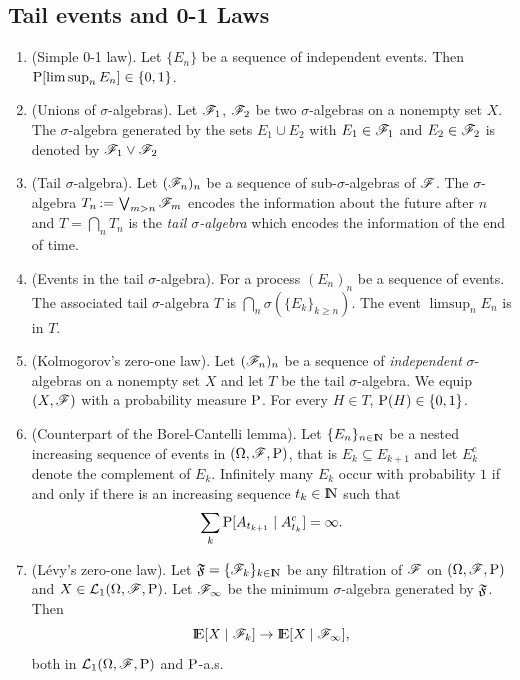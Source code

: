 \documentclass[a4paper,10pt]{scrbook}
\begin{document}
\subsection{Tail events and 0-1 Laws}
\begin{enumerate}

 \item (Simple 0-1 law). Let $\{E_n\}$ be a sequence of independent events. Then $\mathrm{P}[\limsup_n E_n]\in \{0,1\}$.
 \item (Unions of $\sigma$-algebras). Let $\mathscr{F}_1$, $\mathscr{F}_2$ be two $\sigma$-algebras on a nonempty set $X$.
       The $\sigma$-algebra generated by the sets $E_1\cup E_2$ with $E_1\in\mathscr{F}_1$ and $E_2\in\mathscr{F}_2$ is 
       denoted by $\mathscr{F}_1 \vee \mathscr{F}_2$
 
 \item (Tail $\sigma$-algebra). Let $(\mathscr{F}_n)_{n}$ be a sequence of sub-$\sigma$-algebras of $\mathscr{F}$.
       The $\sigma$-algebra $T_n{}\mathop{\mathrel{:}=}{} \bigvee_{m>n}\mathscr{F}_m$ encodes the information about the future 
       after $n$ and $T=\bigcap_n T_n$ is the \textit{tail $\sigma$-algebra} which encodes the 
       information of the end of time. 
       
 \item (Events in the tail $\sigma$-algebra). For a process $(E_n)_n$ be a sequence of events. 
       The associated tail $\sigma$-algebra $T$ is $\bigcap_n \sigma(\{E_k\}_{k\geq n})$.
       The event $\limsup_n E_n$ is in $T$.
 
 \item (Kolmogorov's zero-one law). Let $(\mathscr{F}_n)_n$ be a sequence of \textit{independent}
       $\sigma$-algebras on a nonempty set $X$ and let $T$ be the tail $\sigma$-algebra.
       We equip $(X,\mathscr{F})$ with a probability measure $\mathrm{P}$. For every $H\in T$,
       $\mathrm{P}(H)\in\{0,1\}$.
 
 \item (Counterpart of the Borel-Cantelli lemma). 
 Let $\{E_n\}_{n\in\N}$ be a nested increasing sequence of events in $(\Omega,\mathscr{F},\mathrm{P})$, that is 
 $E_k\subseteq E_{k+1}$ and let $E_k^c$ denote the complement of $E_k$.
 Infinitely many $E_k$ occur with probability $1$ if and only if there is an increasing sequence 
 $t_k\in\N$ such that
 \[
  \sum_k \mathrm{P}[A_{t_{k+1}}\mid A_{t_k}^c]  = \infty.
 \] 
 
 \item (L\'evy's zero-one law). Let $\Ff=\{\F_k\}_{k\in\N}$ be any filtration of $\mathscr{F}$ on $(\Omega,\mathscr{F},\mathrm{P})$ and
 $X\in\mathcal{L}_1(\Omega,\mathscr{F},\mathrm{P})$. Let $\mathscr{F}_\infty$ be the minimum $\sigma$-algebra generated by $\mathfrak{F}$. Then
 \[
  \E[X\mid \F_k] \to \E[X\mid \F_\infty], 
 \]
 both in $\mathcal{L}_1(\Omega,\mathscr{F},\mathrm{P})$ and $\mathrm{P}$-a.s.
\end{enumerate}
\end{document}

